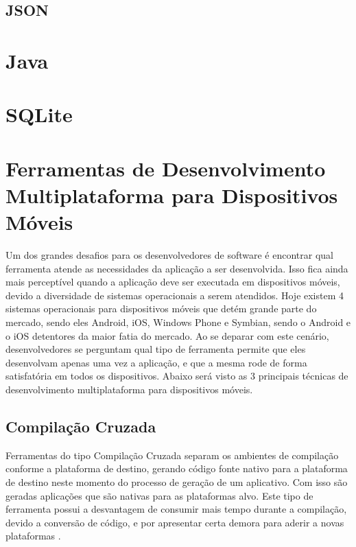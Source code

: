 \subsection{JSON}

\section{Java}

\section{SQLite}

\section{Ferramentas de Desenvolvimento Multiplataforma para Dispositivos Móveis}
Um dos grandes desafios para os desenvolvedores de software é encontrar qual ferramenta atende as necessidades da aplicação a ser desenvolvida. Isso fica ainda mais perceptível quando a aplicação deve ser executada em dispositivos móveis, devido a diversidade de sistemas operacionais a serem atendidos. Hoje existem 4 sistemas operacionais para dispositivos móveis que detém grande parte do mercado, sendo eles Android, iOS, Windows Phone e Symbian, sendo o Android e o iOS detentores da maior fatia do mercado. Ao se deparar com este cenário, desenvolvedores se perguntam qual tipo de ferramenta permite que eles desenvolvam apenas uma vez a aplicação, e que a mesma rode de forma satisfatória em todos os dispositivos. Abaixo será visto as 3 principais técnicas de desenvolvimento multiplataforma para dispositivos móveis\cite{CrossPlatformMobileDevelopment2011}.

\subsection{Compilação Cruzada}
Ferramentas do tipo Compilação Cruzada separam os ambientes de compilação conforme a plataforma de destino, gerando código fonte nativo para a plataforma de destino neste momento do processo de geração de um aplicativo. Com isso são geradas aplicações que são nativas para as plataformas alvo. Este tipo de ferramenta possui a desvantagem de consumir mais tempo durante a compilação, devido a conversão de código, e por apresentar certa demora para aderir a novas plataformas
\cite{CrossPlatformMobileDevelopment2011}.

